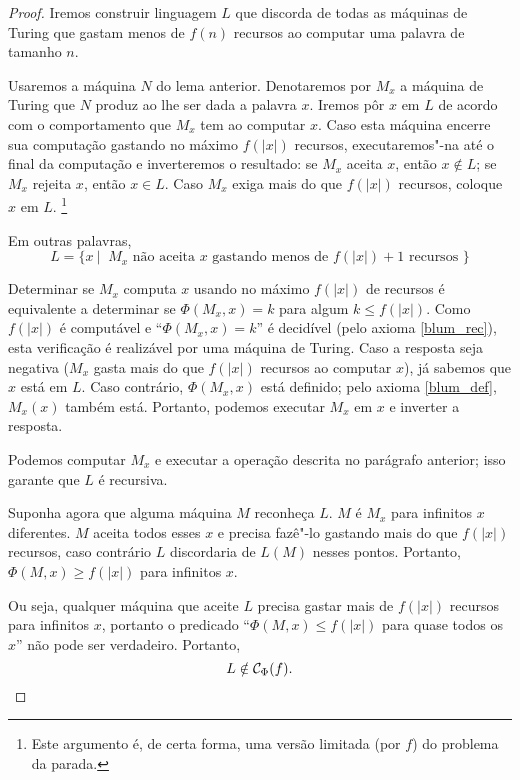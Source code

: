 \begin{proof}
    Iremos construir linguagem $L$
    que discorda de todas as máquinas de Turing que gastam menos de
    $f(n)$ recursos ao computar uma palavra de tamanho $n$.

    Usaremos a máquina $N$ do lema anterior.
    Denotaremos por $M_x$
    a máquina de Turing que $N$ produz
    ao lhe ser dada a palavra $x$.
    Iremos pôr $x$ em $L$
    de acordo com o comportamento que $M_x$ tem ao computar $x$.
    Caso esta máquina encerre sua computação
    gastando no máximo $f(|x|)$ recursos,
    executaremos"-na até o final da computação
    e inverteremos o resultado:
    se $M_x$ aceita $x$, então $x \notin L$;
    se $M_x$ rejeita $x$, então $x \in L$.
    Caso $M_x$ exiga mais do que $f(|x|)$ recursos,
    coloque $x$ em $L$.
    \footnote{
        Este argumento é,
        de certa forma,
        uma versão limitada
        (por $f$)
        do problema da parada.
    }

    Em outras palavras,
    \begin{equation*}
        L = \{ x \ | \ \text{
            $M_x$ não aceita $x$ gastando menos de $f(|x|)+1$ recursos
        } \}
    \end{equation*}

    Determinar se $M_x$ computa $x$ usando no máximo $f(|x|)$ de recursos
    é equivalente a determinar se $\Phi(M_x, x) = k$
    para algum $k \leq f(|x|)$.
    Como $f(|x|)$ é computável
    e ``$\Phi(M_x, x) = k$'' é decidível
    (pelo axioma \ref{blum_rec}),
    esta verificação é realizável por uma máquina de Turing.
    Caso a resposta seja negativa
    ($M_x$ gasta mais do que $f(|x|)$ recursos ao computar $x$),
    já sabemos que $x$ está em $L$.
    Caso contrário,
    $\Phi(M_x, x)$ está definido;
    pelo axioma \ref{blum_def},
    $M_x(x)$ também está.
    Portanto, podemos executar $M_x$ em $x$
    e inverter a resposta.

    Podemos computar $M_x$ e executar a operação descrita no parágrafo anterior;
    isso garante que $L$ é recursiva.

    Suponha agora que alguma máquina $M$ reconheça $L$.
    $M$ é $M_x$ para infinitos $x$ diferentes.
    $M$ aceita todos esses $x$
    e precisa fazê"-lo gastando mais do que $f(|x|)$ recursos,
    caso contrário $L$ discordaria de $L(M)$ nesses pontos.
    Portanto, $\Phi(M, x) \geq f(|x|)$ para infinitos $x$.

    Ou seja, qualquer máquina que aceite $L$
    precisa gastar mais de $f(|x|)$ recursos para infinitos $x$,
    portanto o predicado ``$\Phi(M, x) \leq f(|x|)$ para quase todos os $x$''
    não pode ser verdadeiro.
    Portanto,
    \begin{equation*}
        L \notin \mathcal C_\Phi(f). \qedhere
    \end{equation*}
\end{proof}

